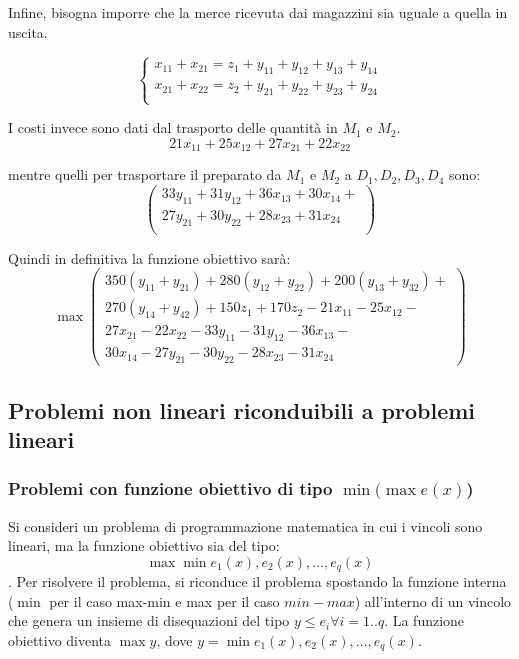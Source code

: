 \documentclass{article}
\begin{document}
Infine, bisogna imporre che la merce ricevuta dai magazzini sia uguale a quella 
in uscita.

\begin{equation*}
  \begin{cases}
    x_{11} + x_{21} = z_1 + y_{11} + y_{12} + y_{13} + y_{14} \\
    x_{21} + x_{22} = z_2 + y_{21} + y_{22} + y_{23} + y_{24} \\
  \end{cases}
\end{equation*}



I costi invece sono dati dal trasporto delle quantità in $M_1$ e $M_2$.
\begin{equation*}
  21x_{11} + 25x_{12} + 27x_{21} + 22x_{22} 
\end{equation*}

mentre quelli per trasportare il preparato da $M_1$ e $M_2$ a $D_1,D_2,D_3,D_4$
sono:
\begin{equation*}
  \begin{pmatrix}
  33y_{11} + 31y_{12} + 36x_{13} + 30x_{14} + \\
  27y_{21} + 30y_{22} + 28x_{23} + 31x_{24}  \\
  \end{pmatrix}
\end{equation*}

Quindi in definitiva la funzione obiettivo sarà:
\begin{equation*}
  \max
  \begin{pmatrix}
  350(y_{11} + y_{21}) + 280(y_{12} + y_{22}) + 200(y_{13} + y_{32}) + \\ 
  270(y_{14} + y_{42}) + 150z_1 + 170z_2 - 21x_{11} - 25x_{12} -\\ 
  27x_{21} - 22x_{22} - 33y_{11} - 31y_{12} - 36x_{13} - \\ 
  30x_{14} - 27y_{21} - 30y_{22} - 28x_{23} - 31x_{24}
\end{pmatrix}
\end{equation*}

\subsection{Problemi non lineari riconduibili a problemi lineari}
\subsubsection{Problemi con funzione obiettivo di tipo $\min (\max e(x)$)}
Si consideri un problema di programmazione matematica in cui i vincoli sono 
lineari, ma la funzione obiettivo sia del tipo: $$\max \min {e_1(x), e_2(x),
\dots,e_q(x)}$$. Per risolvere il problema, si riconduce il problema spostando 
la funzione interna ($\min$ per il caso max-min e max per il caso $min-max$) 
all'interno di un vincolo che genera un insieme di disequazioni del tipo 
$y \leq e_i \forall i = 1..q$. La funzione obiettivo diventa $\max y$, dove 
$y = \min{e_1(x),e_2(x),\dots,e_q(x)}$.
\end{document}
